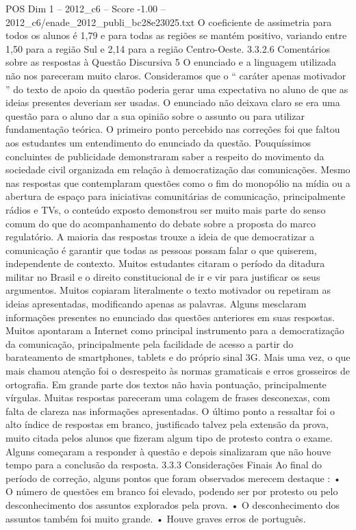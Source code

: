 \begin{textsample}{POS Dim 1 – 2012\_c6 – Score -1.00 – 2012\_c6/enade\_2012\_publi\_bc28e23025.txt}
O coeficiente de assimetria para todos os alunos é 1,79 e para todas as regiões se mantém positivo, variando entre 1,50 para a região Sul e 2,14 para a região Centro-Oeste. 3.3.2.6 Comentários sobre as respostas à Questão Discursiva 5 O enunciado e a linguagem utilizada não nos pareceram muito claros.
Consideramos que o “ caráter apenas motivador ” do texto de apoio da questão poderia gerar uma expectativa no aluno de que as ideias presentes deveriam ser usadas.
O enunciado não deixava claro se era uma questão para o aluno dar a sua opinião sobre o assunto ou para utilizar fundamentação teórica.
O primeiro ponto percebido nas correções foi que faltou aos estudantes um entendimento do enunciado da questão.
Pouquíssimos concluintes de publicidade demonstraram saber a respeito do movimento da sociedade civil organizada em relação à democratização das comunicações.
Mesmo nas respostas que contemplaram questões como o fim do monopólio na mídia ou a abertura de espaço para iniciativas comunitárias de comunicação, principalmente rádios e TVs, o conteúdo exposto demonstrou ser muito mais parte do senso comum do que do acompanhamento do debate sobre a proposta do marco regulatório.
A maioria das respostas trouxe a ideia de que democratizar a comunicação é garantir que todas as pessoas possam falar o que quiserem, independente de contexto.
Muitos estudantes citaram o período da ditadura militar no Brasil e o direito constitucional de ir e vir para justificar os seus argumentos.
Muitos copiaram literalmente o texto motivador ou repetiram as ideias apresentadas, modificando apenas as palavras.
Alguns mesclaram informações presentes no enunciado das questões anteriores em suas respostas.
Muitos apontaram a Internet como principal instrumento para a democratização da comunicação, principalmente pela facilidade de acesso a partir do barateamento de smartphones, tablets e do próprio sinal 3G.
Mais uma vez, o que mais chamou atenção foi o desrespeito às normas gramaticais e erros grosseiros de ortografia.
Em grande parte dos textos não havia pontuação, principalmente vírgulas.
Muitas respostas pareceram uma colagem de frases desconexas, com falta de clareza nas informações apresentadas.
O último ponto a ressaltar foi o alto índice de respostas em branco, justificado talvez pela extensão da prova, muito citada pelos alunos que fizeram algum tipo de protesto contra o exame.
Alguns começaram a responder à questão e depois sinalizaram que não houve tempo para a conclusão da resposta. 3.3.3 Considerações Finais Ao final do período de correção, alguns pontos que foram observados merecem destaque : • O número de questões em branco foi elevado, podendo ser por protesto ou pelo desconhecimento dos assuntos explorados pela prova. • O desconhecimento dos assuntos também foi muito grande. • Houve graves erros de português.

\end{textsample}

